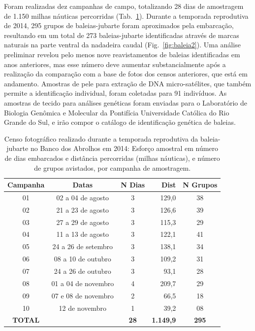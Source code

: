 \documentclass[12pt, A4]{article}
\begin{document}
Foram realizadas dez campanhas de campo, totalizando 28 dias de
amostragem de 1.150 milhas náuticas percorridas
(Tab.~\ref{tab:baleia1}). Durante a temporada reprodutiva de 2014,
295 grupos de baleias-jubarte foram aproximados pela embarcação,
resultando em um total de 273 baleias-jubarte identificadas através de
marcas naturais na parte ventral da nadadeira caudal (Fig.~\ref{fig:baleia2}). 
Uma análise preliminar revelou pelo menos nove reavistamentos de
baleias identificadas em anos anteriores, mas esse número deve
aumentar substancialmente após a realização da comparação com
a base de fotos dos censos anteriores,
que está em andamento. Amostras de pele para extração de DNA
micro-satélites, que também permite a identificação individual, foram
coletadas para 91 indivíduos. As amostras de tecido para análises
genéticas foram enviadas para o Laboratório de Biologia
Genômica e Molecular da Pontifícia Universidade Católica do Rio Grande
do Sul, e irão compor o catálogo de identificação genética de baleias.

\begin{table}
\centering
\caption{Censo fotográfico realizado durante a temporada reprodutiva da baleia-jubarte no Banco dos Abrolhos em 2014:
Esforço amostral em número de dias embarcados e distância percorridas (milhas náuticas), e número de grupos avistados,
por campanha de amostragem.}
\begin{tabular}{cccrc}
\toprule  
    \textbf{Campanha} & \textbf{Datas} & \textbf{N Dias} & \textbf{Dist} & \textbf{N Grupos} \\
\midrule
    01 & 02 a 04 de agosto & 3 & 129,0 & 38 \\
    02 & 21 a 23 de agosto & 3 & 126,6 & 39 \\
    03 & 27 a 29 de agosto & 3 & 115,3 & 29 \\
    04 & 11 a 13 de agosto & 3 & 122,1 & 41 \\
    05 & 24 a 26 de setembro & 3 & 138,1 & 34 \\
    06 & 08 a 10 de outubro & 3 & 109,2 & 31 \\
    07 & 24 a 26 de outubro & 3 & 93,1 & 28 \\
    08 & 01 a 04 de novembro & 4 & 209,7 & 29 \\
    09 & 07 e 08 de novembro & 2 & 66,5 & 18 \\
    10 & 12 de novembro & 1 & 39,2 & 08 \\
    \textbf{TOTAL} & & \textbf{28} & \textbf{1.149,9} & \textbf{295} \\
\bottomrule
  \end{tabular}
  \label{tab:baleia1}
\end{table}
\end{document}
